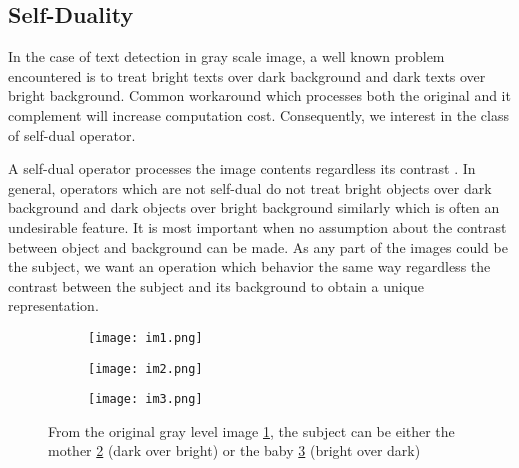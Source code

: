 \subsection{Self-Duality}
\par 
In the case of text detection in gray scale image, a well known problem encountered is to treat bright texts over dark background and dark texts over bright background. Common workaround which processes both the original and it complement will increase computation cost. Consequently, we interest in the class of self-dual operator.
\par
A self-dual operator processes the image contents regardless its contrast \cite{geraud.15.ismm}. In general, operators which are not self-dual do not treat bright objects over dark background and dark objects over bright background similarly which is often an undesirable feature. It is most important when no assumption about the contrast between object and background can be made. As any part of the images could be the subject, we want an operation which behavior the same way regardless the contrast between the subject and its background to obtain a unique representation.  
\begin{figure}

	\begin{subfigure}{0.3\textwidth}
	 	\texttt{[image: im1.png]} \caption{}\label{fig:gray} \end{subfigure}
	\begin{subfigure}{0.3\textwidth}
		\texttt{[image: im2.png]} \caption{}\label{fig:mother} \end{subfigure}
	\begin{subfigure}{0.3\textwidth}
		\texttt{[image: im3.png]} \caption{}\label{fig:baby} \end{subfigure}
	\centering
	\caption[Example of \textit{subjects}] {From the original gray level image \ref{fig:gray}, the subject can be either the mother \ref{fig:mother} (dark over bright) or the baby \ref{fig:baby} (bright over dark) }
	\label{fig:motheAndBaby}
\end{figure}


